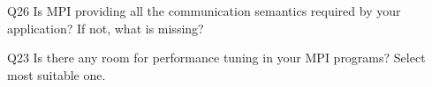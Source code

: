 \begin{description}%
\item{Q26} Is MPI providing all the communication semantics required by your application? If not, what is missing?%
\item{Q23} Is there any room for performance tuning in your MPI programs? Select most suitable one.%
\end{description}%
